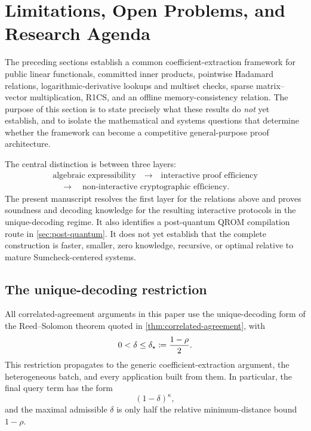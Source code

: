 \section{Limitations, Open Problems, and Research Agenda}
\label{sec:limitations}

The preceding sections establish a common coefficient-extraction framework for public linear functionals, committed inner products, pointwise Hadamard relations, logarithmic-derivative lookups and multiset checks, sparse matrix--vector multiplication, R1CS, and an offline memory-consistency relation.  The purpose of this section is to state precisely what these results do \emph{not} yet establish, and to isolate the mathematical and systems questions that determine whether the framework can become a competitive general-purpose proof architecture.

The central distinction is between three layers:
\begin{equation}
  \boxed{
  \begin{gathered}
    \text{algebraic expressibility}
    \quad\longrightarrow\quad
    \text{interactive proof efficiency}
    \\
    \quad\longrightarrow\quad
    \text{non-interactive cryptographic efficiency}.
  \end{gathered}}
  \label{eq:limitations-three-layers}
\end{equation}
The present manuscript resolves the first layer for the relations above and proves soundness and decoding knowledge for the resulting interactive protocols in the unique-decoding regime.  It also identifies a post-quantum QROM compilation route in \cref{sec:post-quantum}.  It does not yet establish that the complete construction is faster, smaller, zero knowledge, recursive, or optimal relative to mature Sumcheck-centered systems.

\subsection{The unique-decoding restriction}
\label{sec:limitations-unique-decoding}

All correlated-agreement arguments in this paper use the unique-decoding form of the Reed--Solomon theorem quoted in \cref{thm:correlated-agreement}, with
\[
  0<\delta\le \delta_\star\coloneqq\frac{1-\rho}{2}.
\]
This restriction propagates to the generic coefficient-extraction argument, the heterogeneous batch, and every application built from them.  In particular, the final query term has the form
\[
  (1-\delta)^\kappa,
\]
and the maximal admissible $\delta$ is only half the relative minimum-distance bound $1-\rho$.

